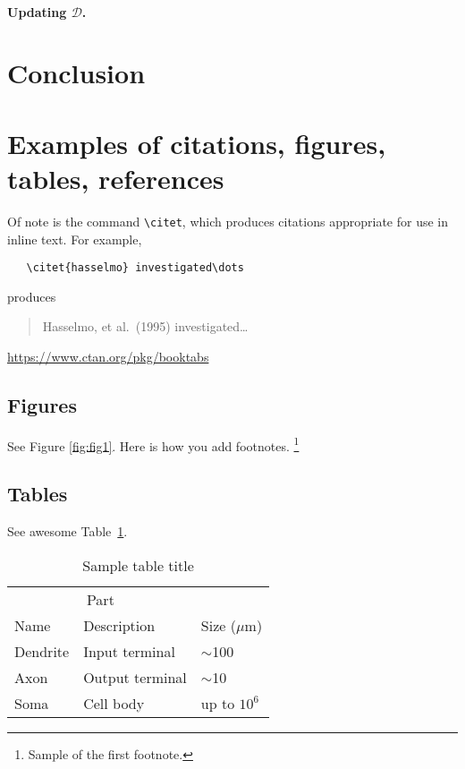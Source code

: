 \documentclass{article}
\begin{document}
\paragraph{Updating $\mathcal{D}$.}

\section{Conclusion}

\section{Examples of citations, figures, tables, references}
\label{sec:others}
 \cite{permacoin-repurposing-bitcoin-work-for-data-preservation}

Of note is the command \verb+\citet+, which produces citations
appropriate for use in inline text.  For example,
\begin{verbatim}
   \citet{hasselmo} investigated\dots
\end{verbatim}
produces
\begin{quote}
  Hasselmo, et al.\ (1995) investigated\dots
\end{quote}

\begin{center}
  \url{https://www.ctan.org/pkg/booktabs}
\end{center}


\subsection{Figures}
\lipsum[10] 
See Figure \ref{fig:fig1}. Here is how you add footnotes. \footnote{Sample of the first footnote.}
\lipsum[11] 


\subsection{Tables}
\lipsum[12]
See awesome Table~\ref{tab:table}.

\begin{table}
 \caption{Sample table title}
  \centering
  \begin{tabular}{lll}
    \toprule
    \multicolumn{2}{c}{Part}                   \\
    \cmidrule(r){1-2}
    Name     & Description     & Size ($\mu$m) \\
    \midrule
    Dendrite & Input terminal  & $\sim$100     \\
    Axon     & Output terminal & $\sim$10      \\
    Soma     & Cell body       & up to $10^6$  \\
    \bottomrule
  \end{tabular}
  \label{tab:table}
\end{table}
\end{document}

